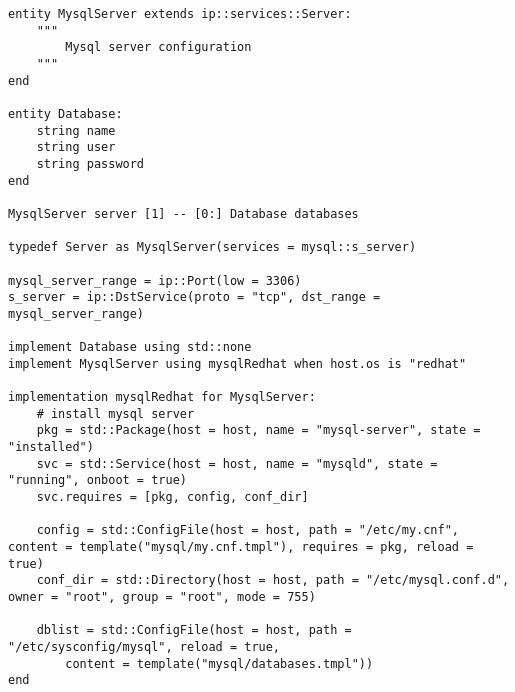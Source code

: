 \begin{minipage}
\begin{lstlisting}[label=listing:mysql_model]
entity MysqlServer extends ip::services::Server:
    """
        Mysql server configuration
    """
end

entity Database:
    string name
    string user
    string password
end

MysqlServer server [1] -- [0:] Database databases

typedef Server as MysqlServer(services = mysql::s_server)

mysql_server_range = ip::Port(low = 3306)
s_server = ip::DstService(proto = "tcp", dst_range = mysql_server_range)

implement Database using std::none
implement MysqlServer using mysqlRedhat when host.os is "redhat"

implementation mysqlRedhat for MysqlServer:
    # install mysql server
    pkg = std::Package(host = host, name = "mysql-server", state = "installed")
    svc = std::Service(host = host, name = "mysqld", state = "running", onboot = true)
    svc.requires = [pkg, config, conf_dir]

    config = std::ConfigFile(host = host, path = "/etc/my.cnf", content = template("mysql/my.cnf.tmpl"), requires = pkg, reload = true)
    conf_dir = std::Directory(host = host, path = "/etc/mysql.conf.d", owner = "root", group = "root", mode = 755)

    dblist = std::ConfigFile(host = host, path = "/etc/sysconfig/mysql", reload = true,
        content = template("mysql/databases.tmpl"))
end
\end{lstlisting}
\end{minipage}
